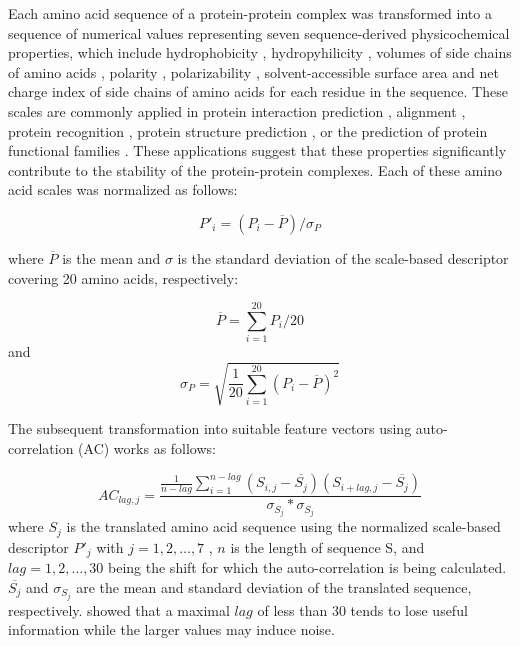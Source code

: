 \documentclass{bioinfo}
\begin{document}
Each amino acid sequence of a protein-protein complex was transformed
into a sequence of numerical values representing seven
sequence-derived physicochemical properties, which include
hydrophobicity \citep{Eisenberg:1984, Koehler:2009}, hydropyhilicity
\citep{Hopp:1981}, volumes of side chains of amino acids
\citep{Krigbaum:1979}, polarity \citep{Grantham:1974}, polarizability
\citep{Charton:1982}, solvent-accessible surface area \citep{Rose:1985}
and net charge index of side chains of amino acids \citep{Zhou:2006}
for each residue in the sequence. These scales are commonly applied in
protein interaction prediction \citep{Bock:2001, Bock:2003},
alignment \citep{Stamm:2013}, protein recognition \citep{Ding:2001},
protein structure prediction \citep{Durham:2009}, or the prediction of
protein functional families \citep{Cai:2003}. These applications
suggest that these properties significantly contribute to the
stability of the protein-protein complexes. Each of these amino acid
scales was normalized as follows: 

\begin{equation}
P'_{i} = (P_i - \overline{P}) / \sigma_P
\end{equation}

where $\overline{P}$ is the mean and $\sigma$ is the standard
deviation of the scale-based descriptor covering 20 amino acids,
respectively: 

\begin{equation}
\overline{P} = \sum^{20}_{i=1}P_i / 20
\end{equation}
 and 
\begin{equation}
\sigma_P = \sqrt{\frac{1}{20} \sum^{20}_{i=1}(P_i - \overline{P})^2}
\end{equation}

The subsequent transformation into suitable feature vectors using
auto-correlation (AC) works as follows: 

\begin{equation}
AC_{lag, j} = \frac {\frac{1}{n-lag} \sum^{n-lag}_{i=1} ( S_{i,j} - \overline{S_j}) (S_{i+lag,j} - \overline{S_j})} { \sigma_{S_j} * \sigma_{S_j} }
\end{equation}
where $S_j$ is the translated amino acid sequence using the normalized
scale-based descriptor $P'_j$ with $j = 1, 2, \dots, 7$ , $n$ is the
length of sequence S, and $lag = 1, 2, \dots, 30$  being the shift for
which the auto-correlation is being calculated. $\overline{S_j}$ and
$\sigma_{S_j}$ are the mean and standard deviation of the translated
sequence, respectively. \citet{Ding:2016} showed that a maximal
$lag$ of less than 30 tends to lose useful information while the
larger values may induce noise. 
\end{document}
